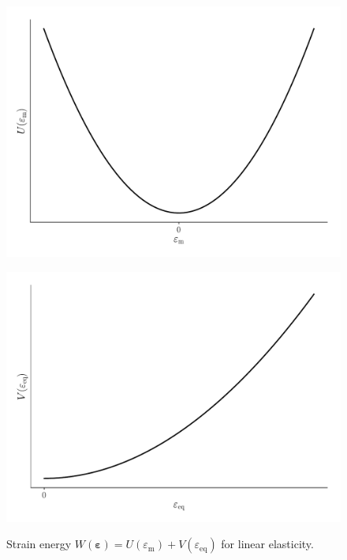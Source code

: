 \documentclass[times,namecite]{goose-article}
\begin{document}
\begin{figure}[htp]
  \centering
  \captionsetup[subfigure]{justification=centering}
  \begin{minipage}[t]{.49\textwidth}
    \centering
    \includegraphics[width=1.\textwidth]{potential_U}
    \label{fig:U}
  \end{minipage}
  \hfill
  \begin{minipage}[t]{.49\textwidth}
    \centering
    \includegraphics[width=1.\textwidth]{potential_V-elas}
    \label{fig:V-elas}
  \end{minipage}
  \caption{Strain energy $W ( \bm{\varepsilon} ) = U ( \varepsilon_\mathrm{m} ) + V ( \varepsilon_\mathrm{eq} )$ for linear elasticity.}
  \label{fig:W-elas}
\end{figure}
\end{document}
